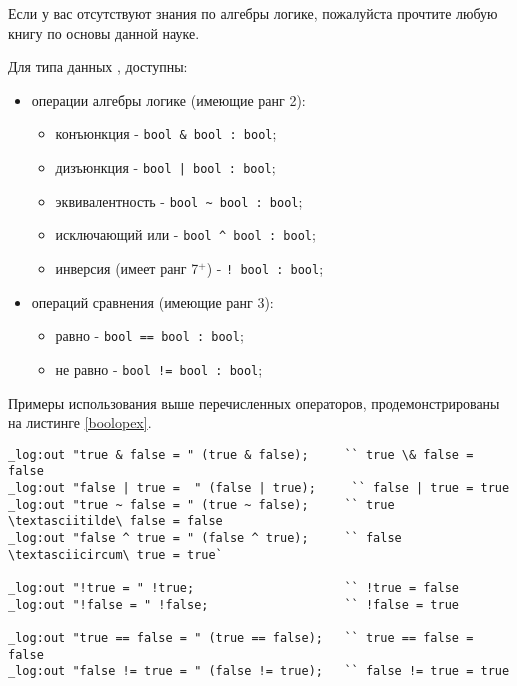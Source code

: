 \documentclass[a4paper, 14pt]{extarticle}
\newenvironment{icItems}
	{ \begin{itemize} [noitemsep,nolistsep] }
	{ \end{itemize} }
\begin{document}
	Если у вас отсутствуют знания по алгебры логике, пожалуйста прочтите любую книгу по основы данной науке.

	Для типа данных , доступны:
\begin{icItems}
	\item операции алгебры логике (имеющие ранг 2):
	\begin{icItems}
		\item конъюнкция - \lstinline`bool & bool : bool`;
		\item дизъюнкция - \lstinline`bool | bool : bool`;
		\item эквивалентность - \lstinline`bool ~ bool : bool`;
		\item исключающий или - \lstinline`bool ^ bool : bool`;
		\item инверсия (имеет ранг 7$^+$) - \lstinline`! bool : bool`;
	\end{icItems}

	\item операций сравнения (имеющие ранг 3):
	\begin{icItems}
		\item равно - \lstinline`bool == bool : bool`;
		\item не равно - \lstinline`bool != bool : bool`;
	\end{icItems}
\end{icItems}

	Примеры использования выше перечисленных операторов, продемонстрированы на листинге \ref{boolopex}.
	
\begin{lstlisting}[caption=Примеры использования операторов над данными типа bool, label=boolopex]
_log:out "true & false = " (true & false);     `` true \& false = false
_log:out "false | true =  " (false | true);     `` false | true = true
_log:out "true ~ false = " (true ~ false);     `` true \textasciitilde\ false = false
_log:out "false ^ true = " (false ^ true);     `` false \textasciicircum\ true = true`

_log:out "!true = " !true;                     `` !true = false
_log:out "!false = " !false;                   `` !false = true

_log:out "true == false = " (true == false);   `` true == false = false
_log:out "false != true = " (false != true);   `` false != true = true
\end{lstlisting}
\end{document}
